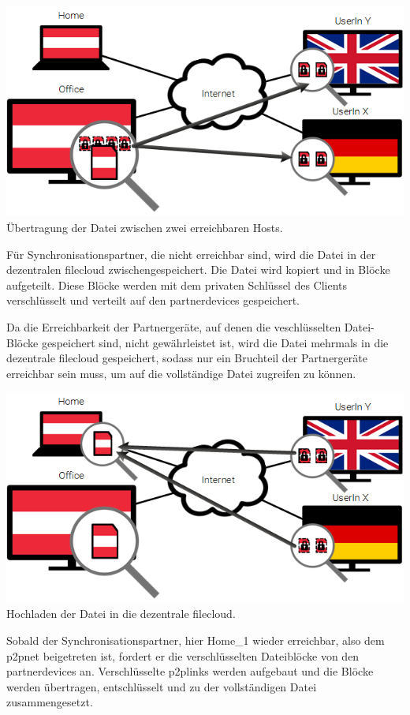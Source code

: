 \includegraphics[]{images/sblit_1}
Übertragung der Datei zwischen zwei erreichbaren Hosts.

Für Synchronisationspartner, die nicht erreichbar sind, wird die Datei in der dezentralen
\gls{filecloud} zwischengespeichert. Die Datei wird kopiert und in Blöcke
aufgeteilt. Diese Blöcke werden mit dem privaten Schlüssel des Clients
verschlüsselt und verteilt auf den \glspl{partnerdevice} gespeichert.

Da die Erreichbarkeit der Partnergeräte, auf denen die veschlüsselten
Datei-Blöcke gespeichert sind, nicht gewährleistet ist, wird die Datei mehrmals
in die dezentrale \gls{filecloud} gespeichert, sodass nur ein Bruchteil der
Partnergeräte erreichbar sein muss, um auf die vollständige Datei zugreifen zu
können.

\includegraphics[]{images/sblit_2}
Hochladen der Datei in die dezentrale \gls{filecloud}.

Sobald der Synchronisationspartner, hier Home_1 wieder erreichbar, also dem
\gls{p2pnet} beigetreten ist, fordert er die verschlüsselten
Dateiblöcke von den \glspl{partnerdevice} an. Verschlüsselte \glspl{p2plink}
werden aufgebaut und die Blöcke werden übertragen, entschlüsselt und zu der
vollständigen Datei zusammengesetzt.

